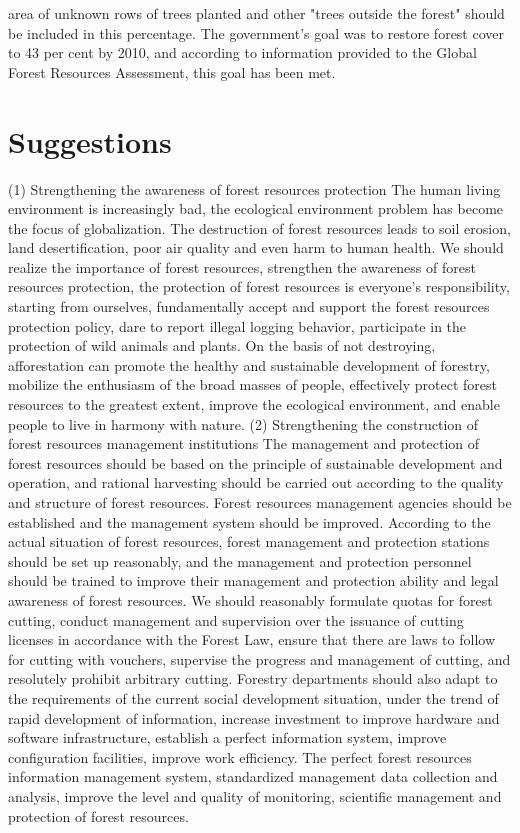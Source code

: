 \documentclass{book}\usepackage{knitr}
\begin{document}
\begin{knitrout}
\begin{kframe}
{area of unknown rows of trees planted and other "trees outside the forest" should be included in this percentage. The government's goal was to restore forest cover to 43 per cent by 2010, and according to information provided to the Global Forest Resources Assessment, this goal has been met.

\section{Suggestions}
(1) Strengthening the awareness of forest resources protection
The human living environment is increasingly bad, the ecological environment problem has become the focus of globalization. The destruction of forest resources leads to soil erosion, land desertification, poor air quality and even harm to human health. We should realize the importance of forest resources, strengthen the awareness of forest resources protection, the protection of forest resources is everyone's responsibility, starting from ourselves, fundamentally accept and support the forest resources protection policy, dare to report illegal logging behavior, participate in the protection of wild animals and plants. On the basis of not destroying, afforestation can promote the healthy and sustainable development of forestry, mobilize the enthusiasm of the broad masses of people, effectively protect forest resources to the greatest extent, improve the ecological environment, and enable people to live in harmony with nature.
(2) Strengthening the construction of forest resources management institutions
The management and protection of forest resources should be based on the principle of sustainable development and operation, and rational harvesting should be carried out according to the quality and structure of forest resources. Forest resources management agencies should be established and the management system should be improved. According to the actual situation of forest resources, forest management and protection stations should be set up reasonably, and the management and protection personnel should be trained to improve their management and protection ability and legal awareness of forest resources. We should reasonably formulate quotas for forest cutting, conduct management and supervision over the issuance of cutting licenses in accordance with the Forest Law, ensure that there are laws to follow for cutting with vouchers, supervise the progress and management of cutting, and resolutely prohibit arbitrary cutting. Forestry departments should also adapt to the requirements of the current social development situation, under the trend of rapid development of information, increase investment to improve hardware and software infrastructure, establish a perfect information system, improve configuration facilities, improve work efficiency. The perfect forest resources information management system, standardized management data collection and analysis, improve the level and quality of monitoring, scientific management and protection of forest resources.
}
\end{kframe}
\end{knitrout}
\end{document}
